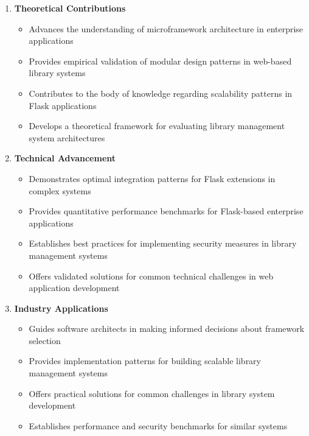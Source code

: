 \documentclass{article}
\begin{document}
\begin{enumerate}
    \item \textbf{Theoretical Contributions}
    \begin{itemize}
        \item Advances the understanding of microframework architecture in 
              enterprise applications
        \item Provides empirical validation of modular design patterns in 
              web-based library systems
        \item Contributes to the body of knowledge regarding scalability patterns 
              in Flask applications
        \item Develops a theoretical framework for evaluating library management 
              system architectures
    \end{itemize}
    
    \item \textbf{Technical Advancement}
    \begin{itemize}
        \item Demonstrates optimal integration patterns for Flask extensions in 
              complex systems
        \item Provides quantitative performance benchmarks for Flask-based 
              enterprise applications
        \item Establishes best practices for implementing security measures in 
              library management systems
        \item Offers validated solutions for common technical challenges in web 
              application development
    \end{itemize}
    
    \item \textbf{Industry Applications}
    \begin{itemize}
        \item Guides software architects in making informed decisions about 
              framework selection
        \item Provides implementation patterns for building scalable library 
              management systems
        \item Offers practical solutions for common challenges in library system 
              development
        \item Establishes performance and security benchmarks for similar systems
    \end{itemize}
    

\end{enumerate}
\end{document}
